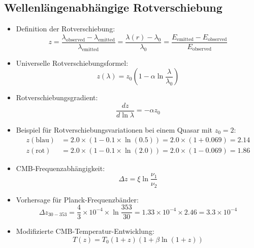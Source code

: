 \documentclass[12pt,a4paper]{article}
\begin{document}
\subsection{Wellenlängenabhängige Rotverschiebung}
\begin{itemize}
	\item Definition der Rotverschiebung:
	\begin{equation}
		z = \frac{\lambda_{\text{observed}} - \lambda_{\text{emitted}}}{\lambda_{\text{emitted}}} = \frac{\lambda(r) - \lambda_0}{\lambda_0} = \frac{E_{\text{emitted}} - E_{\text{observed}}}{E_{\text{observed}}}
	\end{equation}
	
	\item Universelle Rotverschiebungsformel:
	\begin{equation}
		\boxed{z(\lambda) = z_0\left(1 - \alpha \ln\frac{\lambda}{\lambda_0}\right)}
	\end{equation}
	
	\item Rotverschiebungsgradient:
	\begin{equation}
		\frac{dz}{d\ln\lambda} = -\alpha z_0
	\end{equation}
	
	\item Beispiel für Rotverschiebungsvariationen bei einem Quasar mit $z_0 = 2$:
	\begin{align}
		z(\text{blau}) &= 2.0 \times (1 - 0.1 \times \ln(0.5)) = 2.0 \times (1 + 0.069) = 2.14 \\
		z(\text{rot}) &= 2.0 \times (1 - 0.1 \times \ln(2.0)) = 2.0 \times (1 - 0.069) = 1.86
	\end{align}
	
	\item CMB-Frequenzabhängigkeit:
	\begin{equation}
		\Delta z = \xi \ln\frac{\nu_1}{\nu_2}
	\end{equation}
	
	\item Vorhersage für Planck-Frequenzbänder:
	\begin{equation}
		\Delta z_{30-353} = \frac{4}{3} \times 10^{-4} \times \ln\frac{353}{30} = 1.33 \times 10^{-4} \times 2.46 = 3.3 \times 10^{-4}
	\end{equation}
	
	\item Modifizierte CMB-Temperatur-Entwicklung:
	\begin{equation}
		\boxed{T(z) = T_0(1+z)\left(1 + \beta \ln(1+z)\right)}
	\end{equation}
\end{itemize}
\end{document}
